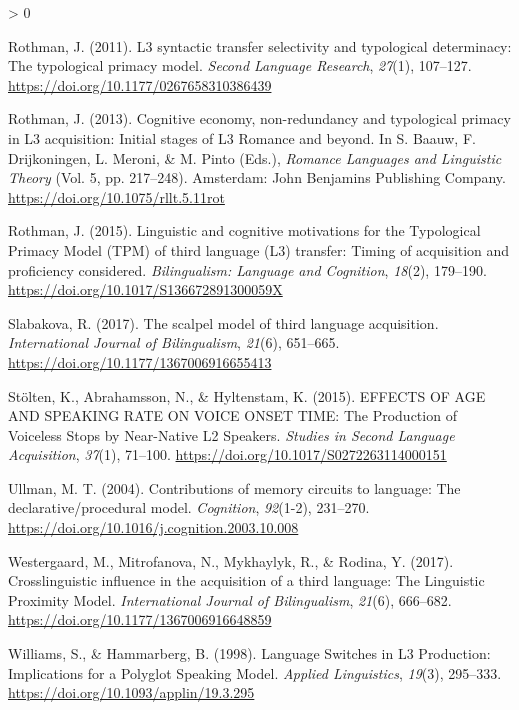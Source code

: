 \documentclass[
  english,
  man]{apa6}
\newlength{\cslhangindent}
\newenvironment{CSLReferences}[2] %
 {%
  \setlength{\parindent}{0pt}
  \ifodd #1 \everypar{\setlength{\hangindent}{\cslhangindent}}\ignorespaces\fi
  \ifnum #2 > 0
  \setlength{\parskip}{#2\baselineskip}
  \fi
 }%
 {}
\begin{document}
\begin{CSLReferences}{1}{0}
\leavevmode\hypertarget{ref-rothman_l3_2011}{}%
Rothman, J. (2011). L3 syntactic transfer selectivity and typological determinacy: {The} typological primacy model. \emph{Second Language Research}, \emph{27}(1), 107--127. \url{https://doi.org/10.1177/0267658310386439}

\leavevmode\hypertarget{ref-baauw_cognitive_2013}{}%
Rothman, J. (2013). Cognitive economy, non-redundancy and typological primacy in {L3} acquisition: {Initial} stages of {L3} {Romance} and beyond. In S. Baauw, F. Drijkoningen, L. Meroni, \& M. Pinto (Eds.), \emph{Romance {Languages} and {Linguistic} {Theory}} (Vol. 5, pp. 217--248). Amsterdam: John Benjamins Publishing Company. \url{https://doi.org/10.1075/rllt.5.11rot}

\leavevmode\hypertarget{ref-rothman_linguistic_2015}{}%
Rothman, J. (2015). Linguistic and cognitive motivations for the {Typological} {Primacy} {Model} ({TPM}) of third language ({L3}) transfer: {Timing} of acquisition and proficiency considered. \emph{Bilingualism: Language and Cognition}, \emph{18}(2), 179--190. \url{https://doi.org/10.1017/S136672891300059X}

\leavevmode\hypertarget{ref-slabakova_scalpel_2017}{}%
Slabakova, R. (2017). The scalpel model of third language acquisition. \emph{International Journal of Bilingualism}, \emph{21}(6), 651--665. \url{https://doi.org/10.1177/1367006916655413}

\leavevmode\hypertarget{ref-stolten_effects_2015}{}%
Stölten, K., Abrahamsson, N., \& Hyltenstam, K. (2015). {EFFECTS} {OF} {AGE} {AND} {SPEAKING} {RATE} {ON} {VOICE} {ONSET} {TIME}: {The} {Production} of {Voiceless} {Stops} by {Near}-{Native} {L2} {Speakers}. \emph{Studies in Second Language Acquisition}, \emph{37}(1), 71--100. \url{https://doi.org/10.1017/S0272263114000151}

\leavevmode\hypertarget{ref-ullman_contributions_2004}{}%
Ullman, M. T. (2004). Contributions of memory circuits to language: The declarative/procedural model. \emph{Cognition}, \emph{92}(1-2), 231--270. \url{https://doi.org/10.1016/j.cognition.2003.10.008}

\leavevmode\hypertarget{ref-westergaard_crosslinguistic_2017}{}%
Westergaard, M., Mitrofanova, N., Mykhaylyk, R., \& Rodina, Y. (2017). Crosslinguistic influence in the acquisition of a third language: {The} {Linguistic} {Proximity} {Model}. \emph{International Journal of Bilingualism}, \emph{21}(6), 666--682. \url{https://doi.org/10.1177/1367006916648859}

\leavevmode\hypertarget{ref-williams_language_1998}{}%
Williams, S., \& Hammarberg, B. (1998). Language {Switches} in {L3} {Production}: {Implications} for a {Polyglot} {Speaking} {Model}. \emph{Applied Linguistics}, \emph{19}(3), 295--333. \url{https://doi.org/10.1093/applin/19.3.295}


\end{CSLReferences}
\end{document}
